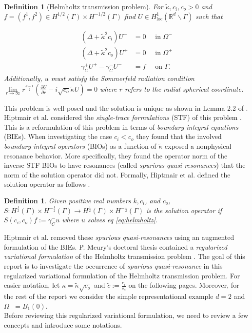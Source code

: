 \documentclass[12pt,journal,compsoc, onecolumn]{IEEEtran}
\newtheorem{definition}[theorem]{Definition}
\begin{document}
\begin{definition}[Helmholtz transmission problem]
For $\tilde \kappa, c_i, c_o > 0$ and \({f} = (f^1, f^2) \in H^{1 / 2}(\Gamma) \times H^{-1 / 2}(\Gamma)\) find \(U \in H_{\operatorname{loc}}^{1}\left(\mathbb{R}^{d} \backslash \Gamma\right)\) 
such that

\begin{align}
    \left(\Delta+\tilde\kappa^{2} c_{i}\right) U^{-} &=0  \quad \text { in } \Omega^{-}  \nonumber \\
    \left(\Delta+\tilde\kappa^{2} c_{o}\right) U^{+} &=0  \quad \text { in } \Omega^{+} \label{eq:helmholtz} \\
    \gamma_{C}^{+} U^{+} - \gamma_{C}^{-} U^{-} &=f \quad  \text { on } \Gamma. \nonumber 
\end{align}
Additionally, $u$ must satisfy the Sommerfeld radiation condition 
\(\lim\limits_{r \rightarrow \infty} r^{\frac{d-1}{2}}\left(\frac{\partial U}{\partial r}-i \sqrt{c_o} \tilde \kappa U\right)=0\) 
where $r$ refers to the radial spherical coordinate. 
\end{definition}  
\noindent
This problem is well-posed and the solution is unique as shown in Lemma 2.2 of \cite{moiola2019acoustic}.
Hiptmair et al. considered the \textit{single-trace formulations} (STF) of this problem  \cite{hiptmair2021spurious}. 
This is a reformulation of this problem in terms of \textit{boundary integral equations} (BIEs). 
When investigating the case $c_i < c_o$ they found that the involved  \textit{boundary integral operators} (BIOs) as a
 function of $\tilde \kappa$ exposed a nonphysical resonance behavior. 
More specifically, they found the operator norm of the inverse STF BIOs to have resonances (called \textit{spurious quasi-resonances})
that the norm of the solution operator did not.
Formally, Hiptmair et al. defined the solution operator as follows \cite{hiptmair2021spurious}.
\begin{definition}
    \label{def:solution_operator}
    Given positive real numbers \(k, c_{i}\), and \(c_{o}\), 
    $S: H^{\frac{1}{2}}(\Gamma) \times H^{-\frac{1}{2}}(\Gamma) \rightarrow  H^{\frac{1}{2}}(\Gamma) \times H^{-\frac{1}{2}}(\Gamma)$ is the solution operator if 
     \(S\left(c_{i}, c_{o}\right) f:=\gamma_{C}^{-} u\)
    where \(u\) solves eq \ref{eq:helmholtz}.
\end{definition}
\noindent Hiptmair et al. removed these \textit{spurious quasi-resonances} 
using an augmented formulation of the BIEs.  P. Meury's doctoral thesis contained a \textit{regularized variational formulation} of the Helmholtz transmission problem \cite{meury2007stable}. 
The goal of this report is to investigate the occurrence of \textit{spurious quasi-resonance}
in this  {regularized variational formulation} of the Helmholtz transmission problem. 
For easier notation, let $\kappa = \tilde \kappa \sqrt{c_o}$ and $\tilde c := \frac{c_i}{c_o}$ on the following pages. Moreover, for the rest of the report
we consider the simple representational example $d = 2$ and $\Omega^- = B_1(0)$.
\\ Before reviewing this regularized variational formulation, we need to review a few concepts and introduce some notations.
\end{document}
